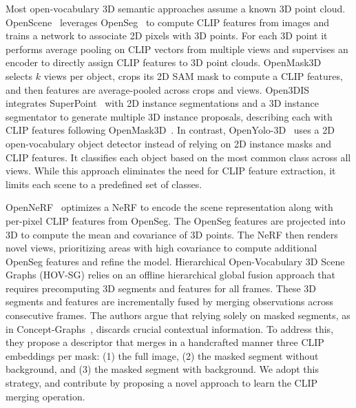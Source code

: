  Most open-vocabulary 3D semantic approaches assume a known 3D point cloud.
OpenScene~\cite{Peng2023OpenScene} leverages OpenSeg~\cite{ghiasi2022scaling} to compute CLIP features from images and trains a network to associate 2D pixels with 3D points.
For each 3D point it performs average pooling on CLIP vectors from multiple views and supervises an encoder to directly assign CLIP features to 3D point clouds. 
OpenMask3D~\cite{takmaz2023openmask3d} selects $k$ views per object, crops its 2D SAM mask to compute a CLIP features, and then features are average-pooled across crops and views. 
Open3DIS~\cite{nguyen2024open3dis} integrates SuperPoint~\cite{detone2018superpoint} with 2D instance segmentations and a 3D instance segmentator to generate multiple 3D instance proposals, describing each with CLIP features following OpenMask3D~\cite{takmaz2023openmask3d}.
In contrast, OpenYolo-3D~\cite{boudjoghra2024openyolo} uses a 2D open-vocabulary object detector instead of relying on 2D instance masks and CLIP features.
It classifies each object based on the most common class across all views.
While this approach eliminates the need for CLIP feature extraction, it limits each scene to a predefined set of classes.

 OpenNeRF~\cite{engelmann2024opennerf} optimizes a NeRF to encode the scene representation along with per-pixel CLIP features from OpenSeg. The OpenSeg features are projected into 3D to compute the mean and covariance of 3D points. The NeRF then renders novel views, prioritizing areas with high covariance to compute additional OpenSeg features and refine the model.
Hierarchical Open-Vocabulary 3D Scene Graphs (HOV-SG) \cite{hovsg} relies on an offline hierarchical global fusion approach that requires precomputing 3D segments and features for all frames. 
These 3D segments and features are incrementally fused by merging observations across consecutive frames.
The authors argue that relying solely on masked segments, as in Concept-Graphs~\cite{gu2024conceptgraphs}, discards crucial contextual information. To address this, they propose a descriptor that merges in a handcrafted manner three CLIP embeddings per mask: (1) the full image, (2) the masked segment without background, and (3) the masked segment with background. We adopt this strategy, and contribute by proposing a novel approach to learn the CLIP merging operation.

